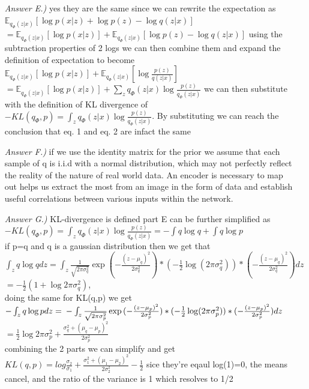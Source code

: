 \documentclass{article}
\theoremstyle{definition}
\theoremstyle{remark}
\begin{document}
\begin{enumerate}[font={\Large\bfseries}]
\begin{itemize}
			\item[\textit{Answer E.)}] yes they are the same since we can rewrite the expectation as\\
			$\mathbb{E}_{q_{\Phi}(z|x)}[\log p(x|z) + \log p(z) - \log q(z|x)]$
			$ = \mathbb{E}_{q_{\Phi}(z|x)}[\log p(x|z)] + \mathbb{E}_{q_{\Phi}(z|x)}[\log p(z) - \log q(z|x)]$ 
			using the subtraction properties of 2 logs we can then combine them and expand the definition of expectation to become\\
			$\mathbb{E}_{q_{\Phi}(z|x)}[\log p(x|z)] + \mathbb{E}_{q_{\Phi}(z|x)}[\log \frac{p(z)}{q(z|x)}]$ 
			$ = \mathbb{E}_{q_{\Phi}(z|x)}[\log p(x|z)] + \sum_z q_{\Phi}(z|x) \log \frac{p(z)}{q_{\Phi}(z|x)}$ we can then substitute with 
			the definition of KL divergence of $-KL(q_{\Phi}, p) = \int_z q_{\Phi}(z|x) \log \frac{p(z)}{q_{\Phi}(z|x)}$.
			By substituting we can reach the conclusion that eq. 1 and eq. 2 are infact the same

			\item[\textit{Answer F.)}] if we use the identity matrix for the prior we assume that each sample of q is i.i.d with a normal distribution,
			which may not perfectly reflect the reality of the nature of real world data. An encoder is necessary to map out helps us extract the most 
			from an image in the form of data and establish useful correlations between various inputs within the network.
			
			\item[\textit{Answer G.)}] KL-divergence is defined part E can be further simplified as\\
			$-KL(q_{\Phi}, p) = \int_z q_{\Phi}(z|x) \log \frac{p(z)}{q_{\Phi}(z|x)} = -\int q \log q + \int q \log p$\\
			if p=q and q is a gaussian distribution then we get that\\ 
			$\int_z q \log q dz= \int_z \frac{1}{\sqrt{2\pi \sigma_q^2}} \exp{(-\frac{(z-\mu_q)^2}{2\sigma^2_q})}*(-\frac{1}{2}\log(2\pi\sigma_q^2))*(-\frac{(z-\mu_q)^2}{2\sigma^2_q})dz$
			$ = -\frac{1}{2}(1+ \log 2\pi\sigma_q^2)$, \\
			doing the same for KL(q,p) we get\\
			$-\int_z q \log p dz =\\ -\int_z \frac{1}{\sqrt{2\pi \sigma_p^2}} \exp{(-\frac{(z-\mu_p)^2}{2\sigma^2_p})}*(-\frac{1}{2}\log(2\pi\sigma_p^2))*(-\frac{(z-\mu_p)^2}{2\sigma^2_p}) dz$
			$ = \frac{1}{2} \log 2\pi\sigma_p^2 + \frac{\sigma_q^2 + (\mu_q - \mu_p)^2}{2\sigma_p^2}$\\
			combining the 2 parts we can simplify and get\\ 
			$KL(q,p) = log \frac{\sigma_2}{\sigma_1}+ \frac{\sigma_1^2+(\mu_1-\mu_2)^2}{2\sigma_2^2} - \frac{1}{2}$
			sice they're eqaul log(1)=0, the means cancel, and the ratio of the variance is 1 which resolves to 1/2 
			

\end{itemize}
\end{enumerate}
\end{document}
